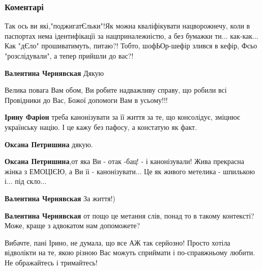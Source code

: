  
 
 
 
 
\subsubsection{Коментарі}

\begin{itemize} %

Так ось ви які,"поджигатЄльки"!Як можна кваліфікувати нацворожнечу, коли в
паспортах нема ідентифікацїі за нацприналежністю, а без бумажки
ти... как-как... Как "дЄло" прошиватимуть, питаю?! Тобто, шофЬОр-шефір злився в
кефір, Фсьо "розслідували", а тепер прийшли до вас?!


\textbf{Валентина Чернявская} Дякую

Велика повага Вам обом, Ви робите надважливу справу, що робили всі Провідники до Вас, Божої допомоги Вам в усьому!!!

\textbf{Ірину Фаріон} треба канонізувати за її життя за те, що консолідує, зміцнює українську націю. І це кажу без пафосу, а констатую як факт.

\begin{itemize} %
\textbf{Оксана Петришина} дякую.

\textbf{Оксана Петришина},от яка Ви - отак -бац! - і канонізували! Жива прекрасна жінка з ЕМОЦІЄЮ, а Ви їі - канонізувати... Це як живого метелика - шпилькою і... під скло...

\textbf{Валентина Чернявская} За життя!)

\textbf{Валентина Чернявская} от пощо це метання слів, понад то в такому контексті? Може, краще з адвокатом нам допоможете?


Вибачте, пані Ірино, не думала, що все АЖ так серйозно! Просто хотіла відволікти на
те, якою різною Вас можуть сприймати і по-справжньому любити. Не ображайтесь і
тримайтесь!

\end{itemize} %


\end{itemize}
